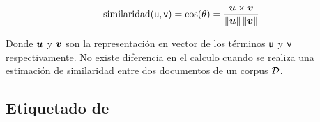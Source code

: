 \begin{equation} \label{eq:cosine-similarity-estimate}
  \mathrm{similaridad}({\mathit{\mathsf{u}}}, {\mathit{\mathsf{v}}}) = \cos(\theta) = \frac{{\bm{u}} \times {\bm{v}}}{\left\lVert{\bm{u}}\right\rVert \left\lVert{\bm{v}}\right\rVert}
\end{equation}

Donde ${\bm{u}}$ y ${\bm{v}}$ son la representación en vector de los términos ${\mathit{\mathsf{u}}}$ y ${\mathit{\mathsf{v}}}$ respectivamente. No existe diferencia en el calculo cuando se realiza una estimación de similaridad entre dos documentos de un \gls{corpus} $\mathcal{D}$.


\subsection{Etiquetado de }


\subsection{}
